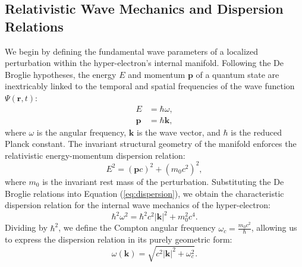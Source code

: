 \subsection{Relativistic Wave Mechanics and Dispersion Relations}
We begin by defining the fundamental wave parameters of a localized perturbation within the hyper-electron's internal manifold. Following the De Broglie hypotheses, the energy $E$ and momentum $\mathbf{p}$ of a quantum state are inextricably linked to the temporal and spatial frequencies of the wave function $\Psi(\mathbf{r}, t)$:
\begin{align}
    E &= \hbar \omega, \\
    \mathbf{p} &= \hbar \mathbf{k},
\end{align}
where $\omega$ is the angular frequency, $\mathbf{k}$ is the wave vector, and $\hbar$ is the reduced Planck constant. The invariant structural geometry of the manifold enforces the relativistic energy-momentum dispersion relation:
\begin{equation}
    E^2 = (\mathbf{p}c)^2 + (m_0 c^2)^2, \label{eq:dispersion}
\end{equation}
where $m_0$ is the invariant rest mass of the perturbation. Substituting the De Broglie relations into Equation (\ref{eq:dispersion}), we obtain the characteristic dispersion relation for the internal wave mechanics of the hyper-electron:
\begin{equation}
    \hbar^2 \omega^2 = \hbar^2 c^2 |\mathbf{k}|^2 + m_0^2 c^4. \label{eq:wave_dispersion}
\end{equation}
Dividing by $\hbar^2$, we define the Compton angular frequency $\omega_c = \frac{m_0 c^2}{\hbar}$, allowing us to express the dispersion relation in its purely geometric form:
\begin{equation}
    \omega(\mathbf{k}) = \sqrt{c^2 |\mathbf{k}|^2 + \omega_c^2}. \label{eq:omega_k}
\end{equation}

